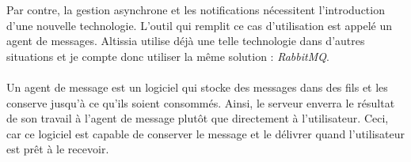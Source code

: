 Par contre, la gestion asynchrone et les notifications nécessitent l'introduction d'une nouvelle technologie.
L'outil qui remplit ce cas d'utilisation est appelé un agent de messages.
Altissia utilise déjà une telle technologie dans d'autres situations et je compte donc utiliser la même solution : \textit{RabbitMQ}.

\paragraph{}
Un agent de message est un logiciel qui stocke des messages dans des fils et les conserve jusqu'à ce qu'ils soient consommés.
Ainsi, le serveur enverra le résultat de son travail à l'agent de message plutôt que directement à l'utilisateur.
Ceci, car ce logiciel est capable de conserver le message et le délivrer quand l'utilisateur est prêt à le recevoir.
